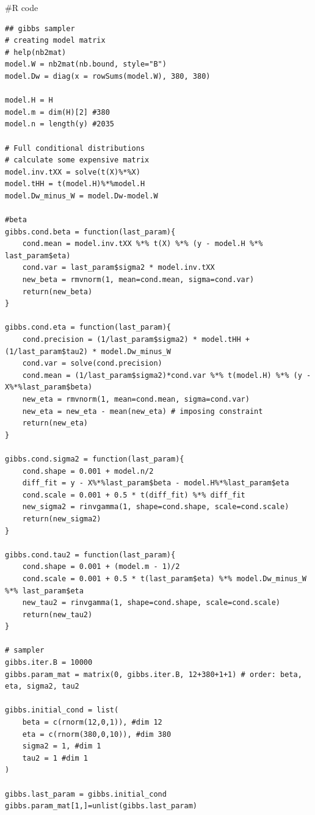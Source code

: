 \documentclass{article}
\newenvironment{Rcode}%
{%
    \begin{mdframed}
    \#R code
    \begin{small}
}
{%
    \end{small}
    \end{mdframed}
}
\begin{document}
\begin{Rcode}
    \begin{verbatim}
## gibbs sampler
# creating model matrix
# help(nb2mat)
model.W = nb2mat(nb.bound, style="B")
model.Dw = diag(x = rowSums(model.W), 380, 380)

model.H = H
model.m = dim(H)[2] #380
model.n = length(y) #2035
        
# Full conditional distributions
# calculate some expensive matrix
model.inv.tXX = solve(t(X)%*%X)
model.tHH = t(model.H)%*%model.H
model.Dw_minus_W = model.Dw-model.W

#beta
gibbs.cond.beta = function(last_param){
    cond.mean = model.inv.tXX %*% t(X) %*% (y - model.H %*% last_param$eta)
    cond.var = last_param$sigma2 * model.inv.tXX
    new_beta = rmvnorm(1, mean=cond.mean, sigma=cond.var)
    return(new_beta)
}

gibbs.cond.eta = function(last_param){
    cond.precision = (1/last_param$sigma2) * model.tHH + (1/last_param$tau2) * model.Dw_minus_W
    cond.var = solve(cond.precision)
    cond.mean = (1/last_param$sigma2)*cond.var %*% t(model.H) %*% (y - X%*%last_param$beta)
    new_eta = rmvnorm(1, mean=cond.mean, sigma=cond.var)
    new_eta = new_eta - mean(new_eta) # imposing constraint
    return(new_eta)
}

gibbs.cond.sigma2 = function(last_param){
    cond.shape = 0.001 + model.n/2
    diff_fit = y - X%*%last_param$beta - model.H%*%last_param$eta
    cond.scale = 0.001 + 0.5 * t(diff_fit) %*% diff_fit
    new_sigma2 = rinvgamma(1, shape=cond.shape, scale=cond.scale)
    return(new_sigma2)
}

gibbs.cond.tau2 = function(last_param){
    cond.shape = 0.001 + (model.m - 1)/2
    cond.scale = 0.001 + 0.5 * t(last_param$eta) %*% model.Dw_minus_W %*% last_param$eta
    new_tau2 = rinvgamma(1, shape=cond.shape, scale=cond.scale)
    return(new_tau2)
}

# sampler
gibbs.iter.B = 10000
gibbs.param_mat = matrix(0, gibbs.iter.B, 12+380+1+1) # order: beta, eta, sigma2, tau2

gibbs.initial_cond = list(
    beta = c(rnorm(12,0,1)), #dim 12
    eta = c(rnorm(380,0,10)), #dim 380
    sigma2 = 1, #dim 1
    tau2 = 1 #dim 1
)

gibbs.last_param = gibbs.initial_cond
gibbs.param_mat[1,]=unlist(gibbs.last_param)


\end{verbatim}
\end{Rcode}
\end{document}
